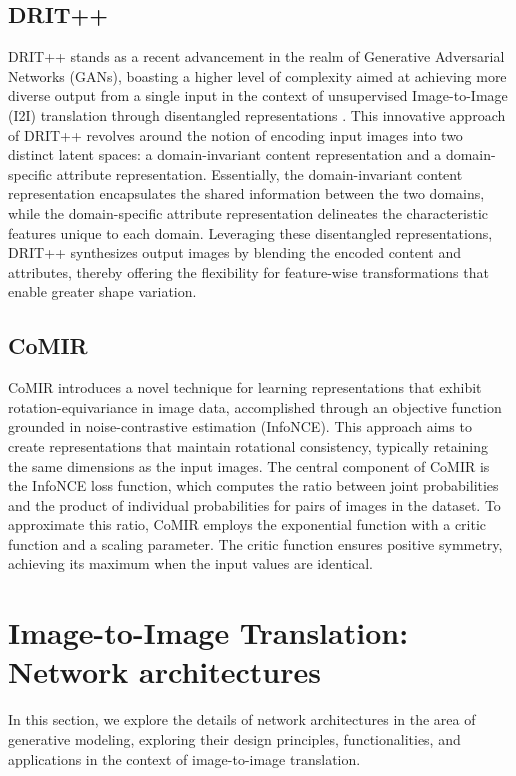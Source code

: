 \documentclass[UKenglish,12pt]{master-style}
\begin{document}
\subsection{DRIT++}

DRIT++ stands as a recent advancement in the realm of Generative Adversarial Networks (GANs), boasting a higher level of complexity aimed at achieving more diverse output from a single input in the context of unsupervised Image-to-Image (I2I) translation through disentangled representations \cite{comparative_study}. This innovative approach of DRIT++ revolves around the notion of encoding input images into two distinct latent spaces: a domain-invariant content representation and a domain-specific attribute representation. Essentially, the domain-invariant content representation encapsulates the shared information between the two domains, while the domain-specific attribute representation delineates the characteristic features unique to each domain. Leveraging these disentangled representations, DRIT++ synthesizes output images by blending the encoded content and attributes, thereby offering the flexibility for feature-wise transformations that enable greater shape variation.

\subsection{CoMIR}

CoMIR introduces a novel technique for learning representations that exhibit rotation-equivariance in image data, accomplished through an objective function grounded in noise-contrastive estimation (InfoNCE)\cite{comparative_study}. This approach aims to create representations that maintain rotational consistency, typically retaining the same dimensions as the input images. The central component of CoMIR is the InfoNCE loss function, which computes the ratio between joint probabilities and the product of individual probabilities for pairs of images in the dataset. To approximate this ratio, CoMIR employs the exponential function with a critic function and a scaling parameter. The critic function ensures positive symmetry, achieving its maximum when the input values are identical.

\section{Image-to-Image Translation: Network architectures} 

In this section, we explore the details of network architectures in the area of generative modeling, exploring their design principles, functionalities, and applications in the context of image-to-image translation.
\end{document}
